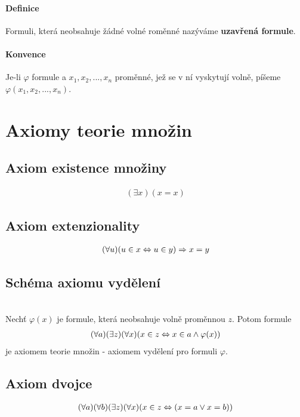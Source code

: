 \documentclass[a4paper,12pt,titlepage]{article}
\begin{document}
\paragraph{Definice}
Formuli, která neobsahuje žádné volné roměnné nazýváme \textbf{uzavřená 
formule}.
\paragraph{Konvence}
Je-li $\varphi$ formule a $x_1, x_2, ..., x_n$ proměnné, jež se v ní vyskytují 
volně, píšeme $\varphi(x_1, x_2, ..., x_n)$.
\section{Axiomy teorie množin}
\setcounter{subsection}{-1}
\label{axiom-existence}
\subsection{Axiom existence množiny}
\setcounter{equation}{0}
\begin{align}
	(\exists x) (x = x)
\end{align}
\label{axiom-extenzionality}
\subsection{Axiom extenzionality}
\setcounter{equation}{0}
\begin{align}
	(\forall u) ( u \in x \Leftrightarrow u \in y) \Rightarrow x = y
\end{align}
\label{schema-axiomu-vydeleni}
\subsection{Schéma axiomu vydělení}
\setcounter{equation}{0}
\\
Nechť $\varphi(x)$ je formule, která neobsahuje volně proměnnou $z$. Potom 
formule
\begin{align}
	(\forall a)(\exists z)(\forall x)(x \in z \Leftrightarrow x \in a \land \varphi(x))
\end{align}
je axiomem teorie množin - axiomem vydělení pro formuli $\varphi$.
\label{axiom-dvojce}
\subsection{Axiom dvojce}
\setcounter{equation}{0}
\begin{align}
	(\forall a)(\forall b)(\exists z)(\forall x)( x \in z \Leftrightarrow ( x = a \lor x = 
	b))
\end{align}
\label{axiom-sumy}
\end{document}
